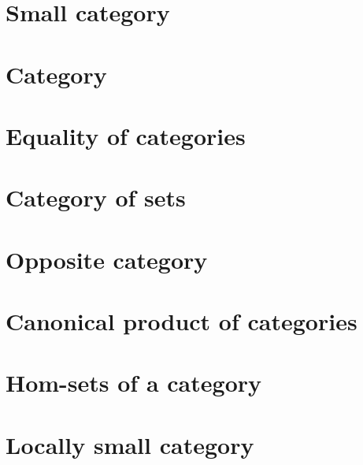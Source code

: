 \section{Small category}
    
\section{Category}
    
\section{Equality of categories}
    
\section{Category of sets}
    
\section{Opposite category}
    
\section{Canonical product of categories}
    
\section{Hom-sets of a category}
    
\section{Locally small category}
    
